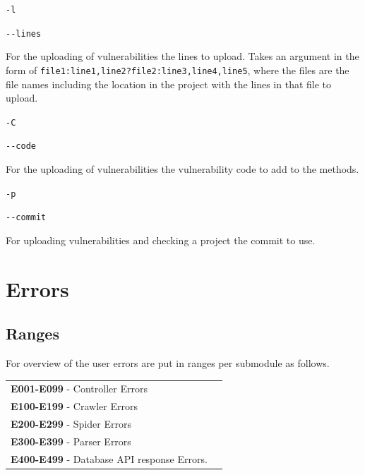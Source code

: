 \documentclass{article}
\begin{document}
\texttt{-l}\par
\texttt{-{}-lines}\par
\begin{adjustwidth}{1cm}{}
For the uploading of vulnerabilities the lines to upload. Takes an argument in the form of \texttt{file1:line1,line2?file2:line3,line4,line5}, where the files are the file names including the location in the project with the lines in that file to upload. \\
\end{adjustwidth}

\texttt{-C}\par
\texttt{-{}-code}\par
\begin{adjustwidth}{1cm}{}
For the uploading of vulnerabilities the vulnerability code to add to the methods. \\
\end{adjustwidth}

\texttt{-p}\par
\texttt{-{}-commit}\par
\begin{adjustwidth}{1cm}{}
For uploading vulnerabilities and checking a project the commit to use. \\
\end{adjustwidth}


\clearpage
\section{Errors}
\subsection{Ranges}
For overview of the user errors are put in ranges per submodule as follows.\\
\begin{tabularx}{\textwidth}{lX} 
    \textbf{E001-E099} - Controller Errors\\
    \textbf{E100-E199} - Crawler Errors\\
    \textbf{E200-E299} - Spider Errors\\
    \textbf{E300-E399} - Parser Errors\\
    \textbf{E400-E499} - Database API response Errors.\\
\end{tabularx}
\end{document}
